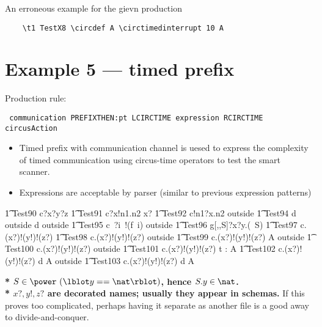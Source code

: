 \documentclass{article}
\begin{document}
An erroneous example for the gievn production 
\begin{verbatim}
	\t1 TestX8 \circdef A \circtimedinterrupt 10 A
\end{verbatim}
		
\section{Example 5 --- timed prefix}

Production rule:
\begin{verbatim}
 communication PREFIXTHEN:pt LCIRCTIME expression RCIRCTIME circusAction
\end{verbatim}

\begin{itemize}
	\item Timed prefix with communication channel is uesed to express the complexity of timed communication using circus-time operators to test the smart scanner.
	\item Expressions are acceptable by parser (similar to previous expression patterns)
\end{itemize}

%
\begin{circusaction}
   \t1 Test90 \circdef c?x?y?z  \Skip
   \also
   \t1 Test91 \circdef c?x!n1.n2 \then \lcirctime x? \rcirctime \Skip 
   \also
   \t1 Test92 \circdef c!n1?x.n2 \then \lcirctime outside \rcirctime \Skip
   \also
   \t1 Test94 \circdef d \then \lcirctime outside \rcirctime d \then \lcirctime outside \rcirctime \Skip 
   \also
   \t1 Test95 \circdef c~?i~!(f~i) \then \lcirctime outside \rcirctime \Skip
   \also
   \t1 Test96 \circdef g[\nat,\nat,S]?x?y.(\theta~S) \then {} \rcirctime \Skip
   \also
   \t1 Test97 \circdef c.(x?)!(y!)!(z?) \then {} \rcirctime \Skip 
   \also
   \t1 Test98 \circdef c.(x?)!(y!)!(z?) \then {} \rcirctime \lcirctime outside 
   \rcirctime \circstartby \Skip 
   \also
   \t1 Test99 \circdef c.(x?)!(y!)!(z?) \then {} \rcirctime A \circendby \lcirctime 
   outside \rcirctime
   \also
   \t1 Test100 \circdef c.(x?)!(y!)!(z?) \then {} \rcirctime \circwait outside
   \also
   \t1 Test101 \circdef c.(x?)!(y!)!(z?) \then {} \rcirctime \circwait t : \nat 
   \circspot  A
   \also
   \t1 Test102 \circdef c.(x?)!(y!)!(z?) \then {} \rcirctime d \then A \circtimeout   
   {\lcirctime outside \rcirctime}  \Skip
   \also
   \t1 Test103 \circdef c.(x?)!(y!)!(z?) \then {} \rcirctime d \then {} 
   \rcirctime A  \Skip
\end{circusaction}     
%
\textbf{* $S \in \power~(\lblot y == \nat \rblot)$, hence $S.y \in \nat$.}
\\
\indent \textbf{* $x?, y!, z?$ are decorated names; usually they appear in schemas.}
%
If this proves too complicated, perhaps having it separate as another file 
is a good away to divide-and-conquer.
\end{document}
